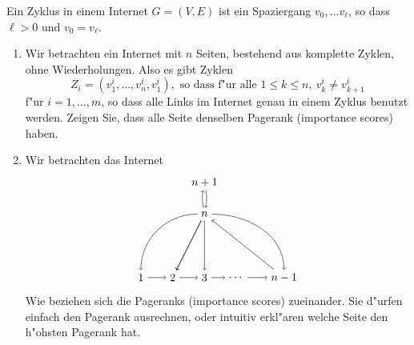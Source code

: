 \documentclass[a4,11pt]{article}
\begin{document}
\begin{aufgabe}
  Ein Zyklus in einem Internet $G = (V, E)$ ist ein Spaziergang $v_0, \dots v_\ell$, so dass $\ell > 0$ und $v_0 = v_\ell$. 
  
  \begin{enumerate}
  \item
  Wir betrachten ein Internet mit $n$ Seiten, bestehend aus komplette Zyklen, ohne Wiederholungen. Also es gibt Zyklen
  \[
  Z_i = (v^i_1, \dots , v^i_n, v^i_1), \text{ so dass f"ur alle } 1 \leq k \leq n, \ v^i_k \neq v^i_{k+1}
  \]
  f"ur $i = 1, \dots , m$, so dass alle Links im Internet genau in einem Zyklus benutzt werden. Zeigen Sie, dass alle Seite denselben Pagerank (importance scores) haben.
  \item
  Wir betrachten das Internet
  \[
 \begin{tikzpicture}
 \node (1) at (1,0) {$1$};
  \node (2) at (2,0) {$2$};
  \node (3) at (3,0) {$3$};
  \node (4) at (4,0) {$\cdots$};
  \node (5) at (5.5,0) {$n -1$};
  \node (n) at (3,2) {$n$};
  \node (nn) at (3,3) {$n + 1$};
\draw[->] (1)--(2);
\draw[->] (2)--(3);
\draw[->] (3)--(4);
\draw[->] (4)--(5);
\draw[->] (n) [out=180, in=90] to (1);
\draw[->] (n)--(2);
\draw[->] (n)--(2);
\draw[->] (n)--(3);
\draw[->] (5)--(n);
\draw[->] (n) [out=0, in=90] to (5);
\draw[->] (n.100) [out=100, in=260] to (nn.260);
\draw[->] (nn.280) [out=280, in=80] to (n.80);
 \end{tikzpicture}
 \]
  Wie beziehen sich die Pageranks (importance scores) zueinander. Sie d"urfen einfach den Pagerank ausrechnen, oder intuitiv erkl"aren welche Seite den h"ohsten Pagerank hat.
  \end{enumerate}
\end{aufgabe}
\end{document}

